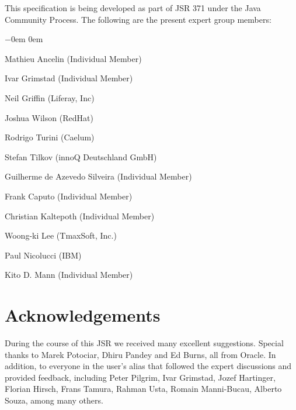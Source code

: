 This specification is being developed as part of JSR 371 under the Java Community Process. The following are the present expert
group members:

\begin{list}{$-$}{\parsep 0em  0em}
\item Mathieu Ancelin (Individual Member)
\item Ivar Grimstad (Individual Member)
\item Neil Griffin (Liferay, Inc)
\item Joshua Wilson (RedHat)
\item Rodrigo Turini (Caelum)
\item Stefan Tilkov (innoQ Deutschland GmbH)
\item Guilherme de Azevedo Silveira (Individual Member)
\item Frank Caputo (Individual Member)
\item Christian Kaltepoth (Individual Member)
\item Woong-ki Lee (TmaxSoft, Inc.)
\item Paul Nicolucci (IBM)
\item Kito D. Mann (Individual Member)
\end{list}

\section{Acknowledgements}
\label{acks}

During the course of this JSR we received many excellent suggestions. Special thanks to Marek
Potociar, Dhiru Pandey and Ed Burns, all from Oracle. In addition, to everyone in the user's alias
that followed the expert discussions and provided feedback, including Peter Pilgrim, Ivar Grimstad, Jozef Hartinger, Florian Hirsch, Frans Tamura, Rahman Usta, Romain Manni-Bucau, Alberto Souza, among many others.

